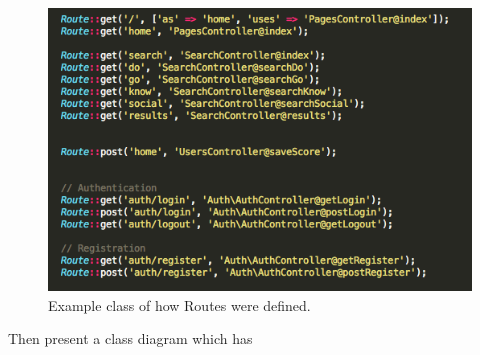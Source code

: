 \documentclass[a4paper, 11pt]{article}
\begin{document}
\begin{figure}[H]
\begin{center}
\includegraphics[scale=0.65]{routes}
\caption{Example class of how Routes were defined.}
\label{routes}
\end{center}
\end{figure}

Then present a class diagram which has 

\end{document}
